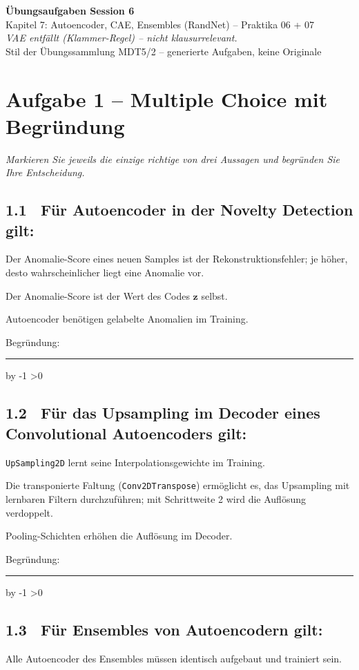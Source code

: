 \documentclass[10pt,a4paper]{article}
\newcommand{\mcbox}{\raisebox{-1pt}{\fbox{\rule{0pt}{7pt}\rule{7pt}{0pt}}}\hspace{6pt}}
\newcommand{\antwortlinien}[1]{%
  \par\vspace{2pt}%
  \newcount\zeilen \zeilen=#1
  \loop
    \noindent\rule{\linewidth}{0.4pt}\par\vspace{11pt}%
    \advance\zeilen by -1
  \ifnum\zeilen>0 \repeat
}
\begin{document}
\begin{center}
  {\Large\bfseries Übungsaufgaben Session 6}\\[4pt]
  {\large Kapitel 7: Autoencoder, CAE, Ensembles (RandNet) -- Praktika 06 + 07}\\[4pt]
  {\footnotesize\itshape VAE entfällt (Klammer-Regel) -- nicht klausurrelevant.}\\[2pt]
  \small Stil der Übungssammlung MDT5/2 -- generierte Aufgaben, keine Originale
\end{center}

\vspace{4pt}

\section*{Aufgabe 1 -- Multiple Choice mit Begründung}
\emph{Markieren Sie jeweils die einzige richtige von drei Aussagen und begründen Sie Ihre Entscheidung.}

\subsection*{1.1 \ Für Autoencoder in der Novelty Detection gilt:}
\mcbox Der Anomalie-Score eines neuen Samples ist der Rekonstruktionsfehler; je höher,
desto wahrscheinlicher liegt eine Anomalie vor.

\mcbox Der Anomalie-Score ist der Wert des Codes $\boldsymbol{z}$ selbst.

\mcbox Autoencoder benötigen gelabelte Anomalien im Training.

Begründung:
\antwortlinien{2}

\subsection*{1.2 \ Für das Upsampling im Decoder eines Convolutional Autoencoders gilt:}
\mcbox \texttt{UpSampling2D} lernt seine Interpolationsgewichte im Training.

\mcbox Die transponierte Faltung (\texttt{Conv2DTranspose}) ermöglicht es, das Upsampling
mit lernbaren Filtern durchzuführen; mit Schrittweite 2 wird die Auflösung verdoppelt.

\mcbox Pooling-Schichten erhöhen die Auflösung im Decoder.

Begründung:
\antwortlinien{2}

\subsection*{1.3 \ Für Ensembles von Autoencodern gilt:}
\mcbox Alle Autoencoder des Ensembles müssen identisch aufgebaut und trainiert sein.
\end{document}
